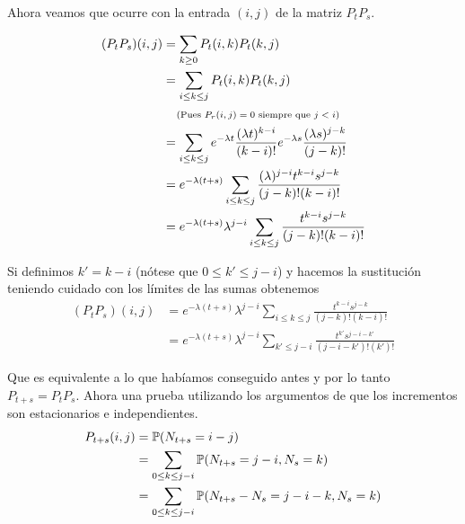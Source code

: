 Ahora veamos que ocurre con la entrada $(i,j)$ de la matriz $P_t P_s$.

\begin{align}
    (P_t P_s)(i,j)      &=  \sum_{k \geq 0}         P_t(i,k) P_t(k,j)                                                                                       \\
                        &=  \sum_{i \leq k \leq j}  P_t(i,k) P_t(k,j)                                                                                       \\
                        &\comment{Pues $P_r(i,j) = 0$ siempre que $j < i$}                                                                                  \\
                        &= \sum_{i \leq k \leq j}  e^{-\lambda t} \frac{(\lambda t)^{k- i}}{(k - i)!} e^{-\lambda s} \frac{(\lambda s)^{j - k}}{(j - k)!}   \\
                        &= e^{-\lambda (t+s)}\sum_{i \leq k \leq j}   \frac{(\lambda)^{j - i} t^{k-i} s^{j-k}}{(j - k)!(k - i)!}                            \\
                        &= e^{-\lambda (t+s)} \lambda^{j - i} \sum_{i \leq k \leq j}   \frac{ t^{k-i} s^{j-k}}{(j - k)!(k - i)!}
\end{align}\pn

Si definimos $k' = k - i$ (nótese que $0 \leq k' \leq j - i$) y hacemos la sustitución teniendo cuidado con los límites de las sumas obtenemos
\begin{align}
    (P_t P_s)(i,j)      &=  e^{-\lambda (t+s)} \lambda^{j - i} \sum_{i \leq k \leq j}   \frac{ t^{k-i} s^{j-k}}{(j - k)!(k - i)!}                           \\
                        &=  e^{-\lambda (t+s)} \lambda^{j - i} \sum_{k' \leq j - i}   \frac{ t^{k'} s^{j - i -k'}}{(j - i - k')!(k')!}                        
\end{align}\pn

Que es equivalente a lo que habíamos conseguido antes y por lo tanto $P_{t+s} = P_t P_s$.
Ahora una prueba utilizando los argumentos de que los incrementos son estacionarios e independientes.
\begin{align}
    P_{t+s}(i,j)    &=  \P(N_{t+s} = i-j)                                              \\
                    &=  \sum_{0 \leq k\leq j-i}\P(N_{t+s} = j-i, N_s = k)              \\
                    &=  \sum_{0 \leq k\leq j-i}\P(N_{t+s} - N_s = j-i-k, N_s = k)      \\
\end{align}\pn

